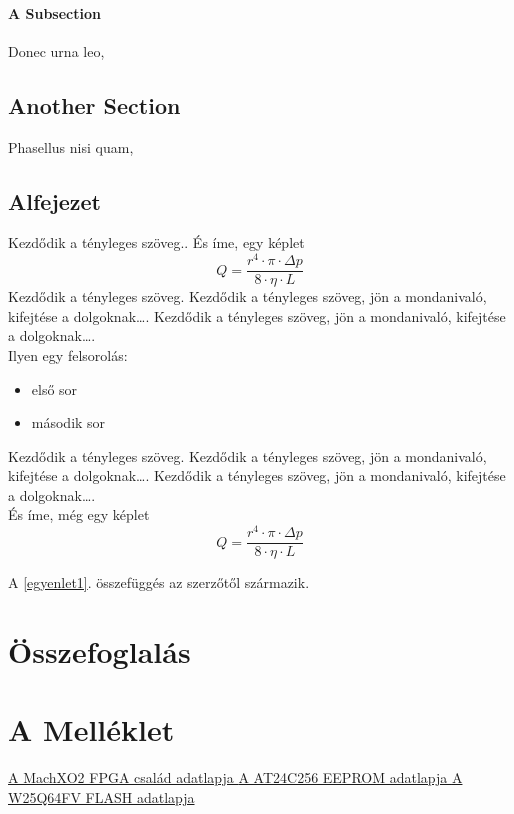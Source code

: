 \documentclass[a4paper,12pt,oneside]{book}
\begin{document}
\subsubsection{A Subsection}

Donec urna leo, 

\section{Another Section}

Phasellus nisi quam, 

\section{Alfejezet}
Kezdődik a tényleges szöveg..
És íme, egy képlet
\begin{equation}
Q=\frac{r^4\cdot \pi \cdot \Delta p}{8\cdot \eta\cdot L}
\end{equation}
Kezdődik a tényleges szöveg. Kezdődik a tényleges szöveg, jön a mondanivaló, kifejtése a dolgoknak…. Kezdődik a tényleges szöveg, jön a mondanivaló, kifejtése a dolgoknak….\\

Ilyen egy felsorolás:
\begin{itemize}
	\item első sor
	\item második sor
\end{itemize}
Kezdődik a tényleges szöveg. Kezdődik a tényleges szöveg, jön a mondanivaló, kifejtése a dolgoknak…. Kezdődik a tényleges szöveg, jön a mondanivaló, kifejtése a dolgoknak….\\

És íme, még egy képlet
\begin{equation}\label{egyenlet1}
Q=\frac{r^4\cdot \pi \cdot \Delta p}{8\cdot \eta\cdot L}
\end{equation}

A \ref{egyenlet1}. összefüggés az \cite{fpgaadatlap} szerzőtől származik.
\backmatter
\chapter{Összefoglalás}
\appendix

\chapter{A Melléklet}
\fi

\renewcommand{\refname}{Irodalomjegyzék}
\begin{thebibliography}{9}
     \href{https://datasheet.octopart.com/LCMXO2-4000HC-4MG132I-Lattice-Semiconductor-datasheet-12584740.pdf}{A MachXO2 FPGA család adatlapja }
	  \href{https://ww1.microchip.com/downloads/en/DeviceDoc/doc0670.pdf}{A AT24C256 EEPROM adatlapja }
	 \href{https://ww1.microchip.com/downloads/en/DeviceDoc/doc0670.pdf}{A W25Q64FV FLASH adatlapja }
\end{thebibliography}
\end{document}
